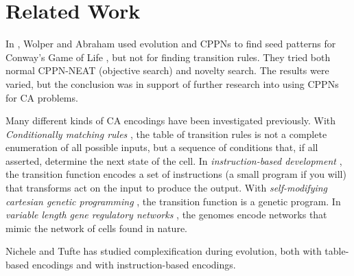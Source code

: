 \section{Related Work}
In \cite{wolper-2015}, Wolper and Abraham used evolution and CPPNs to find seed patterns for Conway's Game of Life \cite{berlekamp1982winning},
but not for finding transition rules.
They tried both normal CPPN-NEAT (objective search) and novelty search.
The results were varied, but the conclusion was in support of further research into using CPPNs for CA problems.

Many different kinds of CA encodings have been investigated previously.
With \textit{Conditionally matching rules} \cite{bidlo2013evolution, bidlo2015investigation, bidlo2015routine},
the table of transition rules is not a complete enumeration of all possible inputs,
but a sequence of conditions that, if all asserted, determine the next state of the cell.
In \textit{instruction-based development} \cite{bidlo2008instruction, bidlo2012evolution, nichele2016genotype,nichele2014evolutionary,nichele2016evolutionary},
the transition function encodes a set of instructions (a small program if you will) that transforms act on the input to produce the output.
With \textit{self-modifying cartesian genetic programming} \cite{harding2011self},
the transition function is a genetic program.
In \textit{variable length gene regulatory networks} \cite{trefzer2013advantages},
the genomes encode networks that mimic the network of cells found in nature.

Nichele and Tufte \cite{nichele2014evolutionary, nichele2016evolutionary, nichele2016genotype} has studied complexification during evolution,
both with table-based encodings and with instruction-based encodings.

